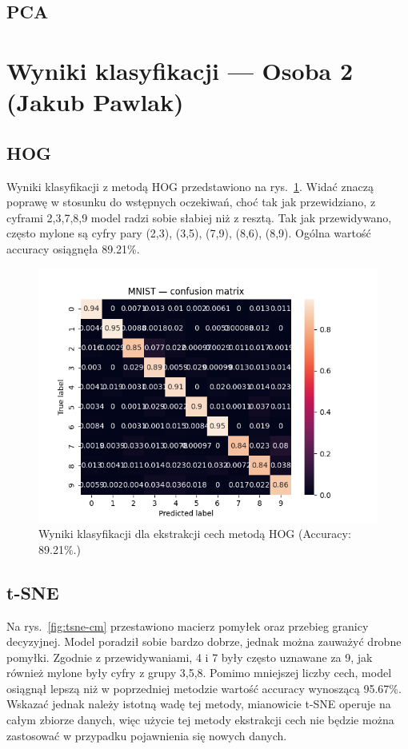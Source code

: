 \documentclass[10pt]{article}
\begin{document}
\subsection*{PCA}

\pagebreak

\section{Wyniki klasyfikacji --- Osoba 2 (Jakub Pawlak)}

\subsection*{HOG}

Wyniki klasyfikacji z metodą HOG przedstawiono na rys.~\ref{fig:hog-cm}.
Widać znaczą poprawę w stosunku do wstępnych oczekiwań, choć tak jak przewidziano, z cyframi 2,3,7,8,9 model radzi sobie słabiej niż z resztą.
Tak jak przewidywano, często mylone są cyfry pary (2,3), (3,5), (7,9), (8,6), (8,9).
Ogólna wartość accuracy osiągnęła 89.21\%.

\begin{figure}[H]
    \centering
    \includegraphics[width=.5\linewidth]{img/mnist_hog_cm.png}
    \caption{Wyniki klasyfikacji dla ekstrakcji cech metodą HOG (Accuracy: 89.21\%.)}\label{fig:hog-cm}
\end{figure}

\subsection*{t-SNE}

Na rys.~\ref{fig:tsne-cm} przestawiono macierz pomyłek oraz przebieg granicy decyzyjnej.
Model poradził sobie bardzo dobrze, jednak można zauważyć drobne pomyłki.
Zgodnie z przewidywaniami, 4 i 7 były często uznawane za 9, jak również mylone były cyfry z grupy 3,5,8.
Pomimo mniejszej liczby cech, model osiągnął lepszą niż w poprzedniej metodzie wartość accuracy wynoszącą 95.67\%.
Wskazać jednak należy istotną wadę tej metody, mianowicie t-SNE operuje na całym zbiorze danych, więc użycie tej metody
ekstrakcji cech nie będzie można zastosować w przypadku pojawnienia się nowych danych.
\end{document}
